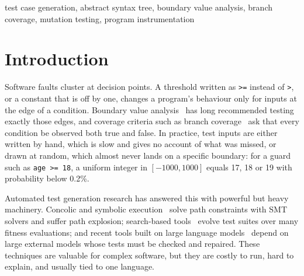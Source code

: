 \documentclass[conference]{IEEEtran}
\begin{document}
\begin{IEEEkeywords}
test case generation, abstract syntax tree, boundary value analysis, branch coverage, mutation testing,
program instrumentation
\end{IEEEkeywords}

\section{Introduction}
Software faults cluster at decision points. A threshold written as \texttt{>=} instead of \texttt{>}, or a
constant that is off by one, changes a program's behaviour only for inputs at the edge of a condition.
Boundary value analysis~\cite{myers2011art} has long recommended testing exactly those edges, and coverage
criteria such as branch coverage~\cite{zhu1997coverage} ask that every condition be observed both true and
false. In practice, test inputs are either written by hand, which is slow and gives no account of what was
missed, or drawn at random, which almost never lands on a specific boundary: for a guard such as
\texttt{age >= 18}, a uniform integer in $[-1000, 1000]$ equals 17, 18 or 19 with probability below 0.2\%.

Automated test generation research has answered this with powerful but heavy machinery. Concolic and symbolic
execution~\cite{godefroid2005dart,sen2005cute,cadar2006exe,cadar2008klee} solve path constraints with SMT
solvers and suffer path explosion; search-based
tools~\cite{korel1990automated,mcminn2004search,fraser2011whole,panichella2018dynamosa,lukasczyk2022pynguin}
evolve test suites over many fitness evaluations; and recent tools built on large language
models~\cite{lemieux2023codamosa,schafer2024testpilot,chen2024chatunitest} depend on large external models whose
tests must be checked and repaired. These techniques are valuable for complex software, but they are costly to
run, hard to explain, and usually tied to one language.
\end{document}
